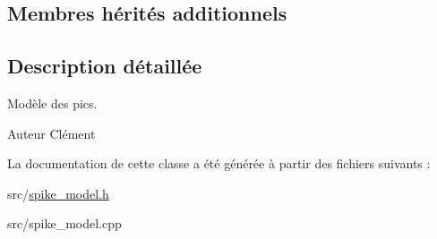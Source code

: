 \subsection*{Membres hérités additionnels}


\subsection{Description détaillée}
Modèle des pics. 

\begin{DoxyAuthor}{Auteur}
Clément 
\end{DoxyAuthor}


La documentation de cette classe a été générée à partir des fichiers suivants \+:\begin{DoxyCompactItemize}
\item 
src/\hyperlink{spike__model_8h}{spike\+\_\+model.\+h}\item 
src/spike\+\_\+model.\+cpp\end{DoxyCompactItemize}
